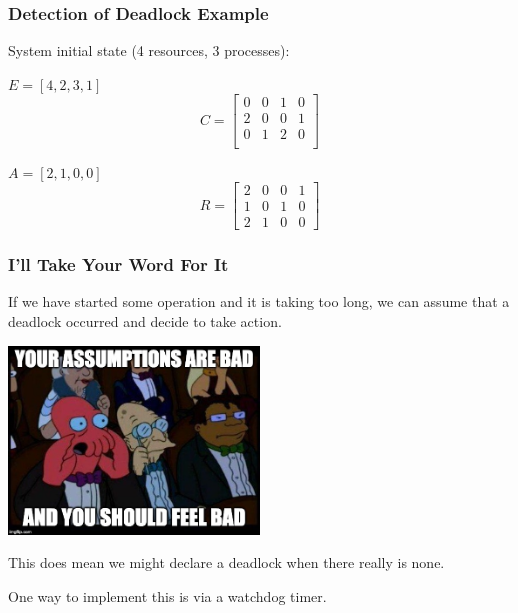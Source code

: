 \begin{frame}
	\frametitle{Detection of Deadlock Example}
	System initial state (4 resources, 3 processes):

	\begin{multicols}{2}
		\begin{center}
			$E = [4, 2, 3, 1]$
			\[ C =
				\left[ {\begin{array}{cccc}
								0 & 0 & 1 & 0 \\
								2 & 0 & 0 & 1 \\
								0 & 1 & 2 & 0 \\
							\end{array} } \right]
			\]
		\end{center}
		\columnbreak

		\begin{center}
			$A = [2, 1, 0, 0]$
			\[ R =
				\left[ {\begin{array}{cccc}
								2 & 0 & 0 & 1 \\
								1 & 0 & 1 & 0 \\
								2 & 1 & 0 & 0
							\end{array} } \right]
			\]
		\end{center}

	\end{multicols}


\end{frame}


\begin{frame}
\frametitle{I'll Take Your Word For It}

If we have started some operation and it is taking too long, we can assume that a deadlock occurred and decide to take action.

\begin{center}
	\includegraphics[width=0.5\textwidth]{images/zoidberg.jpg}
\end{center}

This does mean we might declare a deadlock when there really is none.

One way to implement this is via a watchdog timer.

\end{frame}


